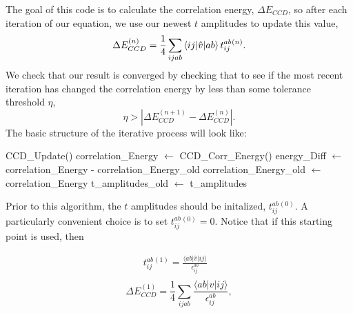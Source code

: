  The goal of this code is to calculate the correlation energy, $\Delta E_{CCD}$, so after each iteration of our equation, we use our newest $t$ amplitudes to update this value,
\begin{equation}
\Delta E_{CCD}^{(n)} = \frac{1}{4} \sum_{ijab} \braket{ij|\hat{v}|ab}t^{ab}_{ij}{}^{(n)}.
\end{equation}
We check that our result is converged by checking that to see if the most recent iteration has changed the correlation energy by less than some tolerance threshold $\eta$,
\begin{equation}
\eta > | \Delta E_{CCD}^{(n+1)} - \Delta E_{CCD}^{(n)} |.
\end{equation}
The basic structure of the iterative process will look like:
\begin{algorithmic}
  \State CCD\_Update()
  \State correlation\_Energy $\gets$ CCD\_Corr\_Energy()
  \State energy\_Diff $\gets$ correlation\_Energy - correlation\_Energy\_old
  \State correlation\_Energy\_old $\gets$ correlation\_Energy
  \State t\_amplitudes\_old $\gets$ t\_amplitudes
  \EndWhile
\end{algorithmic}

Prior to this algorithm, the $t$ amplitudes should be initalized, $t_{ij}^{ab}{}^{(0)}$. A particularly convenient choice is to set $t_{ij}^{ab}{}^{(0)} = 0$. Notice that if this starting point is used, then

\begin{align}
t_{ij}^{ab}{}^{(1)} = \frac{\langle ab \vert \hat{v} \vert ij \rangle}{\epsilon^{ab}_{ij}}   & \nonumber \\
\label{eq:ccdGuess}
\end{align}
\begin{equation}
\Delta E_{CCD}^{(1)} = \frac{1}{4} \sum_{ijab}\frac{\langle ab \vert \hat{v} \vert ij \rangle}{\epsilon^{ab}_{ij}},
\end{equation}

